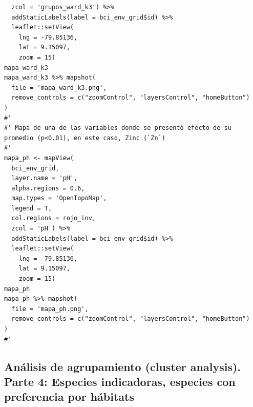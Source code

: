 \documentclass[11pt,]{article}
\begin{document}
\begin{verbatim}
  zcol = 'grupos_ward_k3') %>%
  addStaticLabels(label = bci_env_grid$id) %>% 
  leaflet::setView(
    lng = -79.85136,
    lat = 9.15097,
    zoom = 15)
mapa_ward_k3
mapa_ward_k3 %>% mapshot(
  file = 'mapa_ward_k3.png', 
  remove_controls = c("zoomControl", "layersControl", "homeButton")
)
#' 
#' Mapa de una de las variables donde se presentó efecto de su promedio (p<0.01), en este caso, Zinc (`Zn`)
#' 
mapa_ph <- mapView(
  bci_env_grid,
  layer.name = 'pH',
  alpha.regions = 0.6,
  map.types = 'OpenTopoMap',
  legend = T,
  col.regions = rojo_inv,
  zcol = 'pH') %>%
  addStaticLabels(label = bci_env_grid$id) %>% 
  leaflet::setView(
    lng = -79.85136,
    lat = 9.15097,
    zoom = 15)
mapa_ph
mapa_ph %>% mapshot(
  file = 'mapa_ph.png', 
  remove_controls = c("zoomControl", "layersControl", "homeButton")
)
#' 
\end{verbatim}

\subsection{Análisis de agrupamiento (cluster analysis). Parte 4:
Especies indicadoras, especies con preferencia por
hábitats}\label{anuxe1lisis-de-agrupamiento-cluster-analysis.-parte-4-especies-indicadoras-especies-con-preferencia-por-huxe1bitats}
\end{document}

